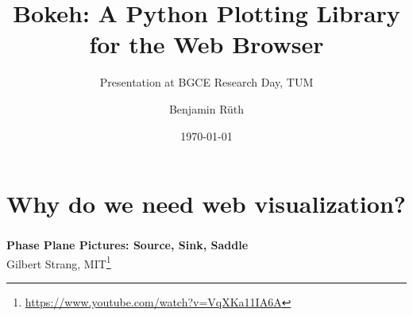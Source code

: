 \documentclass[11pt]{beamer}
\author{Benjamin Rüth}
\title{Bokeh: A Python Plotting Library for the Web Browser}
\subtitle{Presentation at BGCE Research Day, TUM}
\date{\today}
\begin{document}

\begin{frame}
\titlepage
\end{frame}

\section{Why do we need web visualization?}
\begin{frame}
\frametitle{\insertsection}
\textbf{Phase Plane Pictures: Source, Sink, Saddle}\\
Gilbert Strang, MIT\footnote{\url{https://www.youtube.com/watch?v=VqXKa11IA6A}}
\begin{center}
\end{center}
\end{frame}
\end{document}
